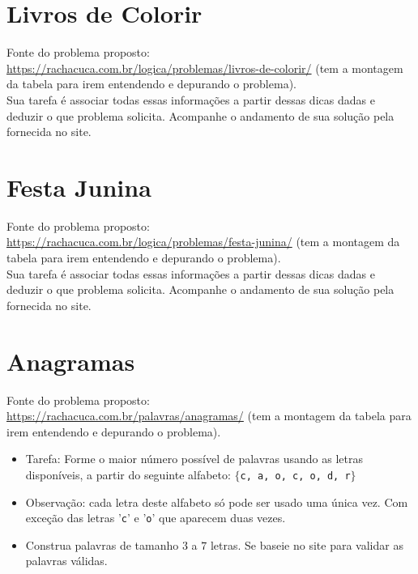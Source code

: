 \documentclass[a4paper,12pt]{article}
\begin{document}
\newpage
\tableofcontents


\newpage
\section{Livros de Colorir}

 Fonte do problema proposto:\\
 \url{https://rachacuca.com.br/logica/problemas/livros-de-colorir/}
 (tem a montagem da tabela para irem entendendo e depurando o problema).\\


\vspace{1.5cm}
 Sua tarefa é associar todas essas informações a partir dessas dicas dadas e deduzir o que problema solicita. Acompanhe o andamento de sua solução pela fornecida no site.
\newpage
\section{Festa Junina}

 Fonte do problema proposto:\\
 \url{https://rachacuca.com.br/logica/problemas/festa-junina/}
 (tem a montagem da tabela para irem entendendo e depurando o problema).\\


\vspace{1.5cm}
 Sua tarefa é associar todas essas informações a partir dessas dicas dadas e deduzir o que problema solicita. Acompanhe o andamento de sua solução pela fornecida no site.
\newpage
\section{Anagramas}

 Fonte do problema proposto:\\
 \url{https://rachacuca.com.br/palavras/anagramas/}
 (tem a montagem da tabela para irem entendendo e depurando o problema).
 
 \begin{itemize}
   \item  Tarefa: Forme o maior número possível de palavras usando as letras disponíveis,
 a partir do seguinte alfabeto: $\{$\texttt{c, a, o, c, o, d, r}$\}$
 
\item  Observação: cada letra deste alfabeto  só pode ser usado uma única vez.
Com exceção das letras '\texttt{c}' e '\texttt{o}' que aparecem duas vezes.
 
\item  Construa palavras de tamanho  $3$ a $7$ letras. Se baseie no site para validar
 as palavras válidas.

 \end{itemize}
\end{document}
